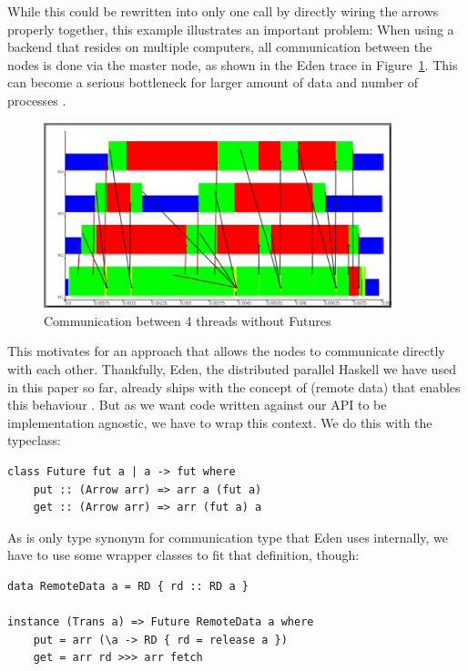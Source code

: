 While this could be rewritten into only one  call by directly wiring the arrows properly together, this example illustrates an important problem: When using a  backend that resides on multiple computers, all communication between the nodes is done via the master node, as shown in the Eden trace in Figure~\ref{fig:withoutFutures}. This can become a serious bottleneck %
for larger amount of data and number of processes \citep[showcases][as, \eg]{Berthold2009b}.
\begin{figure}[ht]
	\centering
	\includegraphics[width=0.9\textwidth]{images/withoutFutures}
	\caption[without Futures]{Communication between 4 threads without Futures}
	\label{fig:withoutFutures}
\end{figure}
This motivates for an approach that allows the nodes to communicate directly with each other. Thankfully, Eden, the distributed parallel Haskell we have used in this paper so far, already ships with the concept of  (remote data) that enables this behaviour \cite{AlGo03a,dieterle2010remotedata}. But as we want code written against our API to be implementation agnostic, we have to wrap this context. We do this with the  typeclass:
\begin{lstlisting}[frame=htrbl]
class Future fut a | a -> fut where
    put :: (Arrow arr) => arr a (fut a)
    get :: (Arrow arr) => arr (fut a) a
\end{lstlisting}
As  is only type synonym for communication type that Eden uses internally, we have to use some wrapper classes to fit that definition, though:
\begin{lstlisting}[frame=htrbl]
data RemoteData a = RD { rd :: RD a }

instance (Trans a) => Future RemoteData a where
    put = arr (\a -> RD { rd = release a })
    get = arr rd >>> arr fetch
\end{lstlisting}
